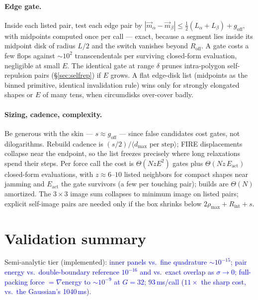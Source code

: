 \documentclass[11pt]{article}
\newcommand{\aside}[1]{\textcolor{blue}{#1}}
\begin{document}
\paragraph{Edge gate.}
Inside each listed pair, test each edge pair by
$|\vec m_\alpha-\vec m_\beta|\le\tfrac12(L_\alpha{+}L_\beta)+g_{\text{off}}$, with
midpoints computed once per call --- exact, because a segment lies inside its
midpoint disk of radius $L/2$ and the switch vanishes beyond $R_{\text{off}}$.  A
gate costs a few flops against $\sim\!10^2$ transcendentals per surviving
closed-form evaluation, negligible at small $E$.  The identical gate at range
$\delta$ prunes intra-polygon self-repulsion pairs (\S\ref{sec:selfrep}) if $E$
grows.  A flat edge-disk list (midpoints as the binned primitive, identical
invalidation rule) wins only for strongly elongated shapes or $E$ of many tens,
when circumdisks over-cover badly.

\paragraph{Sizing, cadence, complexity.}
Be generous with the skin --- $s\approx g_{\text{off}}$ --- since false candidates
cost gates, not dilogarithms.  Rebuild cadence is
$(s/2)/\langle d_{\max}\text{ per step}\rangle$; FIRE displacements collapse near
the endpoint, so the list freezes precisely where long relaxations spend their
steps.  Per force call the cost is $\Theta(NzE^2)$ gates plus
$\Theta(Nz\,E_{\text{act}})$ closed-form evaluations, with $z\approx6$--$10$ listed
neighbors for compact shapes near jamming and $E_{\text{act}}$ the gate survivors
(a few per touching pair); builds are $\Theta(N)$ amortized.  The $3\times3$ image
sum collapses to minimum image on listed pairs; explicit self-image pairs are
needed only if the box shrinks below $2\rho_{\max}+R_{\text{int}}+s$.

\section{Validation summary}
\label{sec:validation}

Semi-analytic tier (implemented): \aside{inner panels vs.\ fine quadrature
$\sim10^{-15}$; pair energy vs.\ double-boundary reference $10^{-16}$ and vs.\ exact
overlap as $\sigma\to0$; full-packing force $=\nabla$energy to $\sim10^{-9}$ at
$G=32$; 93\,ms/call ($11\times$ the sharp cost, vs.\ the Gaussian's 1040\,ms).}
\end{document}
